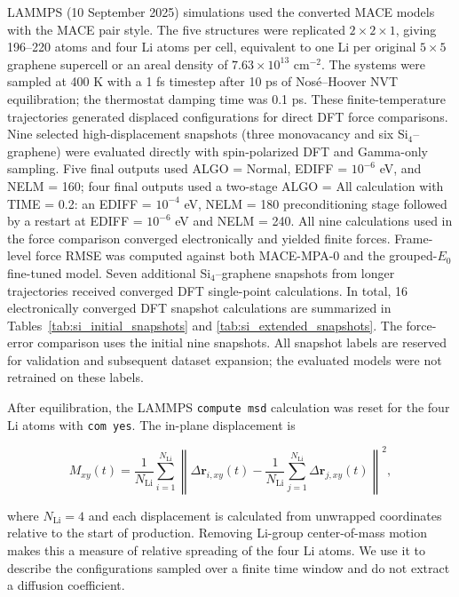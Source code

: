 \documentclass[12pt]{article}
\begin{document}
LAMMPS (10 September 2025) \citep{plimpton1995lammps} simulations used the
converted MACE models with the MACE pair style. The five structures were
replicated $2\times2\times1$, giving 196--220 atoms and four Li atoms per
cell, equivalent to one Li per original $5\times5$ graphene supercell or an
areal density of $7.63\times10^{13}$ cm$^{-2}$. The systems were sampled at
400 K with a 1 fs timestep after 10 ps of Nos\'e--Hoover NVT equilibration; the
thermostat damping time was 0.1 ps. These
finite-temperature trajectories generated displaced configurations for direct
DFT force comparisons.
Nine selected high-displacement snapshots
(three monovacancy and six Si$_4$--graphene) were evaluated directly with
spin-polarized DFT and Gamma-only sampling. Five final outputs used
ALGO = Normal, EDIFF = $10^{-6}$ eV, and NELM = 160; four final outputs used a
two-stage ALGO = All calculation with TIME = 0.2: an EDIFF = $10^{-4}$ eV,
NELM = 180 preconditioning stage followed by a restart at
EDIFF = $10^{-6}$ eV and NELM = 240. All nine calculations used in the force
comparison converged electronically and yielded finite forces. Frame-level force
RMSE was computed against both MACE-MPA-0 and the
grouped-$E_0$ fine-tuned model. Seven additional Si$_4$--graphene snapshots from
longer trajectories received converged DFT single-point calculations. In total, 16
electronically converged DFT snapshot calculations are summarized
in Tables~\ref{tab:si_initial_snapshots} and \ref{tab:si_extended_snapshots}.
The force-error comparison uses the initial nine snapshots. All snapshot
labels are reserved for validation and subsequent dataset expansion;
the evaluated models were not retrained on these labels.

After equilibration, the LAMMPS \texttt{compute msd} calculation was reset for
the four Li atoms with \texttt{com yes}. The in-plane displacement is
\begin{linenomath}
\begin{equation}
 M_{xy}(t)=\frac{1}{N_{\mathrm{Li}}}\sum_{i=1}^{N_{\mathrm{Li}}}
 \left\lVert \Delta\mathbf r_{i,xy}(t)
 -\frac{1}{N_{\mathrm{Li}}}\sum_{j=1}^{N_{\mathrm{Li}}}
 \Delta\mathbf r_{j,xy}(t)\right\rVert^2,
 \label{eq:msd}
\end{equation}
\end{linenomath}
where $N_{\mathrm{Li}}=4$ and each displacement is calculated from unwrapped
coordinates relative to the start of production. Removing Li-group
center-of-mass motion makes this a measure of relative spreading of the four
Li atoms. We use it to describe the configurations sampled over a finite time
window and do not extract a diffusion coefficient.
\end{document}
